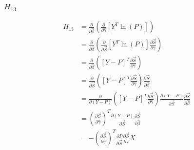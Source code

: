 \documentclass{article}
\begin{document}
\subsubsection{$H_{13}$}
\begin{equation}
\begin{aligned}
H_{13} &= \frac{\partial}{\partial \hat{\beta}}  \left( \frac{\partial}{\partial \hat{\gamma}}  \left[ Y^T \ln \left( P \right) \right] \right)
\\
&= \frac{\partial}{\partial \hat{\beta}}  \left( \frac{\partial}{\partial \vec{S}}  \left[ Y^T \ln \left( P \right) \right] \frac{\partial \vec{S}}{\partial \hat{\gamma}} \right) 
\\
&= \frac{\partial}{\partial \hat{\beta}}  \left( \left[ Y - P \right]^T \frac{\partial \vec{S}}{\partial \hat{\gamma}} \right) 
\\
&= \frac{\partial}{\partial \vec{S}}  \left( \left[ Y - P \right]^T \frac{\partial \vec{S}}{\partial \hat{\gamma}} \right) \frac{\partial \vec{S}}{\partial \hat{\beta}} 
\\
&= \frac{\partial}{\partial \left( Y - P \right)}  \left( \left[ Y - P \right]^T \frac{\partial \vec{S}}{\partial \hat{\gamma}} \right) \frac{\partial \left( Y - P \right)}{\partial \vec{S}} \frac{\partial \vec{S}}{\partial \hat{\beta}} 
\\
&= \left( \frac{\partial \vec{S}}{\partial \hat{\gamma}} \right)^T \frac{\partial \left( Y - P \right)}{\partial \vec{S}} \frac{\partial \vec{S}}{\partial \hat{\beta}} 
\\
&= - \left( \frac{\partial \vec{S}}{\partial \hat{\gamma}} \right)^T \frac{\partial P}{\partial \vec{S}} \frac{\partial \vec{S}}{\partial V} X
\end{aligned}
\end{equation}
\end{document}
